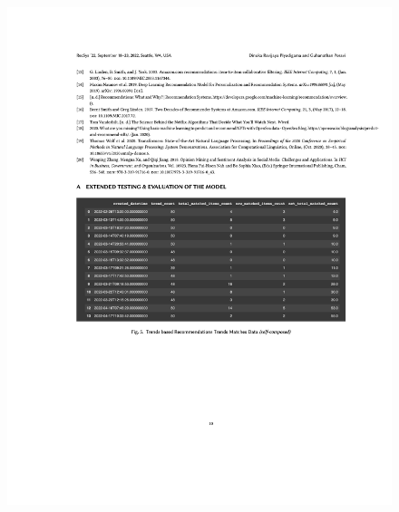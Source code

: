 \begin{figure}[h!]
\centering
\includegraphics[width=\textwidth]{images/appendix/papers/trends/Exploration of the possibility of infusing Social Media Trends into generating NFT Recommendations 10.jpeg}
\end{figure}

